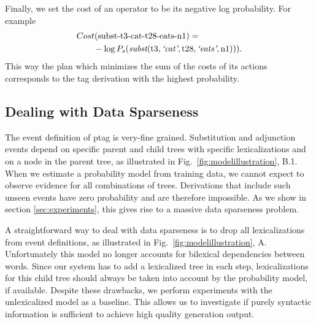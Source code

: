 Finally, we set the cost of an operator to be its negative log probability. For example 
\begin{align*}
&Cost(\mbox{subst-t3-cat-t28-eats-n1}) = \\
 & \qquad -\log P_s(\textit{subst}(\mathrm{t3},\textit{`cat'},\mathrm{t28},\textit{`eats'},\mathrm{n1})) ).
\end{align*}
This way the plan which minimizes the sum of the costs of its actions  corresponds to the {\sc tag} derivation with the highest probability. 

\subsection{Dealing with Data Sparseness}
\label{ssec:sparseness}
The event definition of {\sc ptag} is very-fine grained. Substitution and adjunction events depend on specific parent and child trees with specific lexicalizations and on a node in the parent tree, as illustrated in Fig.~\ref{fig:modelillustration}, B.1. When we estimate a probability model from training data, we cannot expect to observe evidence for all combinations of trees. Derivations that include such unseen events have zero probability and are therefore impossible. As we show in section \ref{sec:experiments}, this gives rise to a massive data sparseness problem.

  A straightforward way to deal with data sparseness is to drop all lexicalizations from event definitions, as illustrated in Fig.~\ref{fig:modelillustration}, A. Unfortunately this model  no longer accounts for bilexical dependencies between words. Since our system has to add a lexicalized tree in each step, lexicalizations for this child tree should always be taken into account by the probability model, if available. Despite these drawbacks, we perform experiments with the unlexicalized model as a baseline. This allows us to investigate if purely syntactic information is sufficient to achieve high quality generation output.

